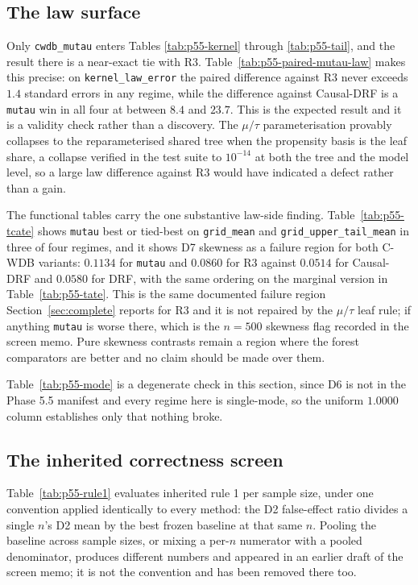 \subsection{The law surface}

Only \texttt{cwdb\_mutau} enters Tables \ref{tab:p55-kernel} through
\ref{tab:p55-tail}, and the result there is a near-exact tie with R3.
Table~\ref{tab:p55-paired-mutau-law} makes this precise: on
\texttt{kernel\_law\_error} the paired difference against R3 never exceeds
$1.4$ standard errors in any regime, while the difference against Causal-DRF is
a \texttt{mutau} win in all four at between $8.4$ and $23.7$. This is the
expected result and it is a validity check rather than a discovery. The
$\mu/\tau$ parameterisation provably collapses to the reparameterised shared
tree when the propensity basis is the leaf share, a collapse verified in the
test suite to $10^{-14}$ at both the tree and the model level, so a large law
difference against R3 would have indicated a defect rather than a gain.

The functional tables carry the one substantive law-side finding.
Table~\ref{tab:p55-tcate} shows \texttt{mutau} best or tied-best on
\texttt{grid\_mean} and \texttt{grid\_upper\_tail\_mean} in three of four
regimes, and it shows D7 skewness as a failure region for both C-WDB variants:
$0.1134$ for \texttt{mutau} and $0.0860$ for R3 against $0.0514$ for Causal-DRF
and $0.0580$ for DRF, with the same ordering on the marginal version in
Table~\ref{tab:p55-tate}. This is the same documented failure region
Section~\ref{sec:complete} reports for R3 and it is not repaired by the
$\mu/\tau$ leaf rule; if anything \texttt{mutau} is worse there, which is the
$n = 500$ skewness flag recorded in the screen memo. Pure skewness contrasts
remain a region where the forest comparators are better and no claim should be
made over them.

Table~\ref{tab:p55-mode} is a degenerate check in this section, since D6 is not
in the Phase 5.5 manifest and every regime here is single-mode, so the uniform
$1.0000$ column establishes only that nothing broke.

\subsection{The inherited correctness screen}

Table~\ref{tab:p55-rule1} evaluates inherited rule 1 per sample size, under one
convention applied identically to every method: the D2 false-effect ratio
divides a single $n$'s D2 mean by the best frozen baseline at that same $n$.
Pooling the baseline across sample sizes, or mixing a per-$n$ numerator with a
pooled denominator, produces different numbers and appeared in an earlier draft
of the screen memo; it is not the convention and has been removed there too.

